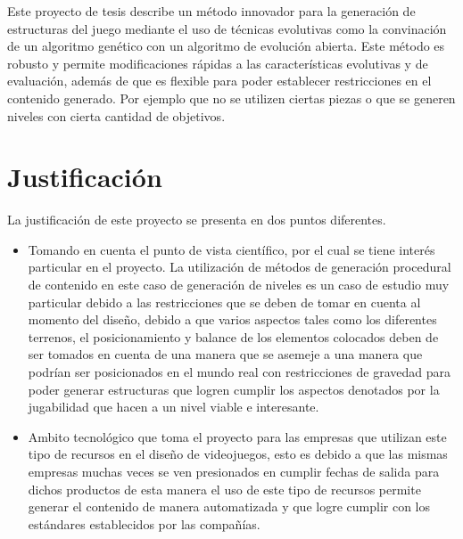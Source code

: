 Este proyecto de tesis describe un método innovador para la generación de
estructuras del juego mediante el uso de técnicas evolutivas como la convinación
de un algoritmo genético con un algoritmo de evolución abierta. Este método es
robusto y permite modificaciones rápidas a las características evolutivas y de
evaluación, además de que es flexible para poder establecer restricciones en el
contenido generado. Por ejemplo que no se utilizen ciertas piezas o que se
generen niveles con cierta cantidad de objetivos.

\section{Justificación}
\label{section:justification}

La justificación de este proyecto se presenta en dos puntos diferentes. 

\begin{itemize}
  \item Tomando en cuenta el punto de vista científico, por el cual
  se tiene interés particular en el proyecto. La utilización de métodos de
  generación procedural de contenido en este caso de generación de niveles es un
  caso de estudio muy particular debido a las restricciones que se deben de
  tomar en cuenta al momento del diseño, debido a que varios aspectos tales como
  los diferentes terrenos, el posicionamiento y balance de los elementos
  colocados deben de ser tomados en cuenta de una manera que se asemeje a una
  manera que podrían ser posicionados en el mundo real con restricciones de
  gravedad para poder generar estructuras que logren cumplir los aspectos
  denotados por la jugabilidad que hacen a un nivel viable e interesante.
  \item Ambito tecnológico que toma el proyecto para las empresas que utilizan
  este tipo de recursos en el diseño de videojuegos, esto es debido a que las
  mismas empresas muchas veces se ven presionados en cumplir fechas de salida para
  dichos productos de esta manera el uso de este tipo de recursos permite generar
  el contenido de manera automatizada y que logre cumplir con los estándares
  establecidos por las compañías.
\end{itemize}
 


